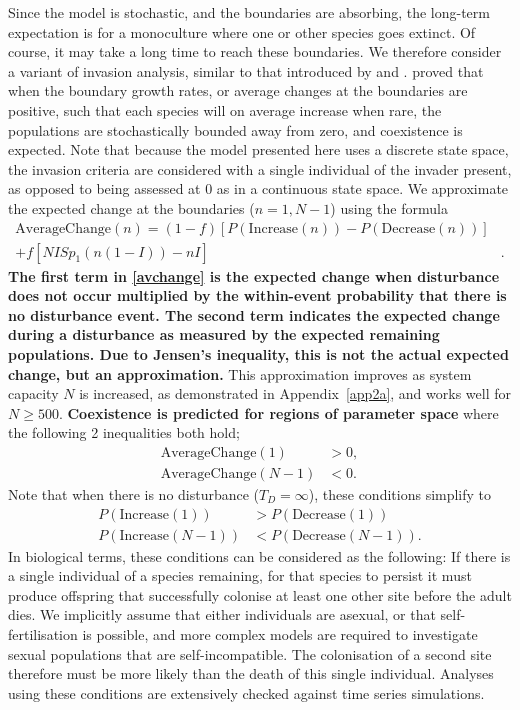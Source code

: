 Since the model is stochastic, and the boundaries are absorbing, the long-term expectation is for a monoculture where one or other species goes extinct. Of course, it may take a long time to reach these boundaries. We therefore consider a variant of invasion analysis, similar to that introduced by \cite{chesson1989invasibility} and \cite{ellner1989convergence}. \cite{chesson1982stabilizing} proved that when the boundary growth rates, or average changes at the boundaries are positive, such that each species will on average increase when rare, the populations are stochastically bounded away from zero, and coexistence is expected. Note that because the model presented here uses a discrete state space, the invasion criteria are considered with a single individual of the invader present, as opposed to being assessed at 0 as in a continuous state space. We approximate the expected change at the boundaries ($n=1,N-1$) using the formula
\begin{equation}
\label{avchange}
\begin{array}{rl}
\text{AverageChange}(n) = (1-f)\left[P(\text{Increase}(n))-P(\text{Decrease}(n))\right]&\\[0.75em]
+ f\left[ NI Sp_1(n(1-I)) - nI\right]&.
\end{array}
\end{equation}
\textbf{The first term in \eqref{avchange} is the expected change when disturbance does not occur multiplied by the within-event probability that there is no disturbance event. The second term indicates the expected change during a disturbance as measured by the expected remaining populations. Due to Jensen's inequality, this is not the actual expected change, but an approximation.} This approximation improves as system capacity $N$ is increased, as demonstrated in Appendix~\ref{app2a}, and works well for $N\geq500$. \textbf{Coexistence is predicted for regions of parameter space} where the following 2 inequalities both hold;
\begin{align}
\label{ac1}\text{AverageChange}(1)&>0, \\
\label{acn-1}\text{AverageChange}(N-1)&<0. \end{align}
Note that when there is no disturbance ($T_D=\infty$), these conditions simplify to 
\begin{align}
\label{lowerboundarycond}P(\text{Increase}(1))&>P(\text{Decrease}(1)) \\
\label{upperboundarycond}P(\text{Increase}(N-1))&<P(\text{Decrease}(N-1)). \end{align}
In biological terms, these conditions can be considered as the following: If there is a single individual of a species remaining, for that species to persist it must produce offspring that successfully colonise at least one other site before the adult dies. We implicitly assume that either individuals are asexual, or that self-fertilisation is possible, and more complex models are required to investigate sexual populations that are self-incompatible. The colonisation of a second site therefore must be more likely than the death of this single individual. Analyses using these conditions are extensively checked against time series simulations.

